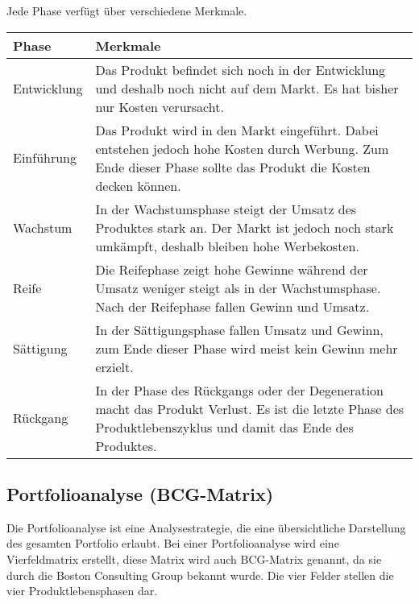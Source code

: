 \begin{flushleft}
    Jede Phase verfügt über verschiedene Merkmale.
\end{flushleft}
\begin{center}
\begin{tabular}{|l|p{8cm}|}
    \hline
    \textbf{Phase} & \textbf{Merkmale} \\
    \hline
    Entwicklung & Das Produkt befindet sich noch in der Entwicklung und deshalb noch nicht auf dem Markt. Es hat bisher nur Kosten verursacht. \\
    \hline
    Einführung & Das Produkt wird in den Markt eingeführt. Dabei entstehen jedoch hohe Kosten durch Werbung. Zum Ende dieser Phase sollte das Produkt die Kosten decken können. \\
    \hline
    Wachstum & In der Wachstumsphase steigt der Umsatz des Produktes stark an. Der Markt ist jedoch noch stark umkämpft, deshalb bleiben hohe Werbekosten. \\
    \hline
    Reife & Die Reifephase zeigt hohe Gewinne während der Umsatz weniger steigt als in der Wachstumsphase. Nach der Reifephase fallen Gewinn und Umsatz. \\
    \hline
    Sättigung & In der Sättigungsphase fallen Umsatz und Gewinn, zum Ende dieser Phase wird meist kein Gewinn mehr erzielt. \\
    \hline
    Rückgang & In der Phase des Rückgangs oder der Degeneration macht das Produkt Verlust. Es ist die letzte Phase des Produktlebenszyklus und damit das Ende des Produktes. \\
    \hline
\end{tabular}
\end{center}

\subsection{Portfolioanalyse (BCG-Matrix)}
\begin{flushleft}
    Die Portfolioanalyse ist eine Analysestrategie, die eine übersichtliche Darstellung des gesamten
    Portfolio erlaubt. Bei einer Portfolioanalyse wird eine Vierfeldmatrix erstellt, diese Matrix wird auch BCG-Matrix
    genannt, da sie durch die Boston Consulting Group bekannt wurde. Die vier Felder stellen die vier Produktlebensphasen dar.
\end{flushleft}
\begin{center}
\end{center}

